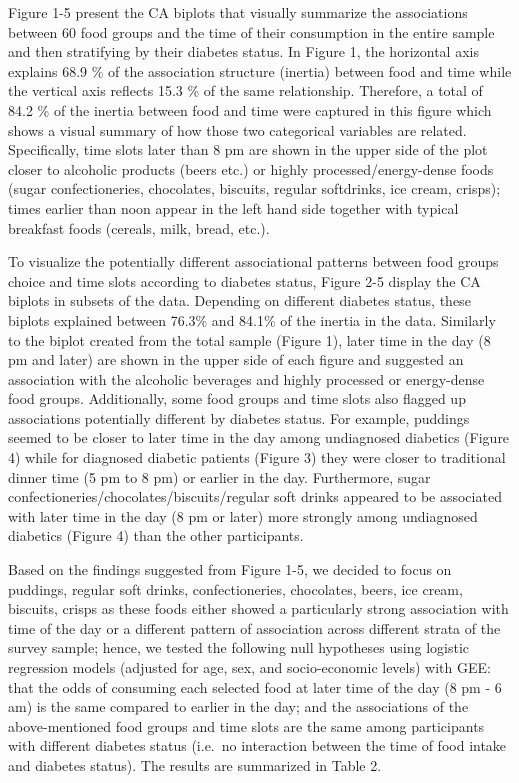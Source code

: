 \documentclass[utf8]{frontiersSCNS}
\begin{document}
Figure 1-5 present the CA biplots that visually summarize the
associations between 60 food groups and the time of their consumption in
the entire sample and then stratifying by their diabetes status. In
Figure 1, the horizontal axis explains 68.9 \% of the association
structure (inertia) between food and time while the vertical axis
reflects 15.3 \% of the same relationship. Therefore, a total of 84.2 \%
of the inertia between food and time were captured in this figure which
shows a visual summary of how those two categorical variables are
related. Specifically, time slots later than 8 pm are shown in the upper
side of the plot closer to alcoholic products (beers etc.) or highly
processed/energy-dense foods (sugar confectioneries, chocolates,
biscuits, regular softdrinks, ice cream, crisps); times earlier than
noon appear in the left hand side together with typical breakfast foods
(cereals, milk, bread, etc.).

To visualize the potentially different associational patterns between
food groups choice and time slots according to diabetes status, Figure
2-5 display the CA biplots in subsets of the data. Depending on
different diabetes status, these biplots explained between 76.3\% and
84.1\% of the inertia in the data. Similarly to the biplot created from
the total sample (Figure 1), later time in the day (8 pm and later) are
shown in the upper side of each figure and suggested an association with
the alcoholic beverages and highly processed or energy-dense food
groups. Additionally, some food groups and time slots also flagged up
associations potentially different by diabetes status. For example,
puddings seemed to be closer to later time in the day among undiagnosed
diabetics (Figure 4) while for diagnosed diabetic patients (Figure 3)
they were closer to traditional dinner time (5 pm to 8 pm) or earlier in
the day. Furthermore, sugar confectioneries/chocolates/biscuits/regular
soft drinks appeared to be associated with later time in the day (8 pm
or later) more strongly among undiagnosed diabetics (Figure 4) than the
other participants.

Based on the findings suggested from Figure 1-5, we decided to focus on
puddings, regular soft drinks, confectioneries, chocolates, beers, ice
cream, biscuits, crisps as these foods either showed a particularly
strong association with time of the day or a different pattern of
association across different strata of the survey sample; hence, we
tested the following null hypotheses using logistic regression models
(adjusted for age, sex, and socio-economic levels) with GEE: that the
odds of consuming each selected food at later time of the day (8 pm - 6
am) is the same compared to earlier in the day; and the associations of
the above-mentioned food groups and time slots are the same among
participants with different diabetes status (i.e.~no interaction between
the time of food intake and diabetes status). The results are summarized
in Table 2.
\end{document}
